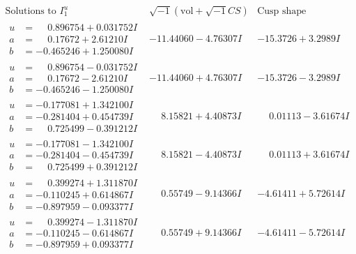 \documentclass[1p]{elsarticle_modified}
\theoremstyle{definition}
\newcommand{\I}{\sqrt{-1}}
\begin{document}
$$\begin{array}{c|c|c}  
\text{Solutions to }I^u_{1}& \I (\text{vol} + \sqrt{-1}CS) & \text{Cusp shape}\\
 \hline 
\begin{aligned}
u &= \phantom{-}0.896754 + 0.031752 I \\
a &= \phantom{-}0.17672 + 2.61210 I \\
b &= -0.465246 + 1.250080 I\end{aligned}
 & -11.44060 - 4.76307 I & -15.3726 + 3.2989 I \\ \hline\begin{aligned}
u &= \phantom{-}0.896754 - 0.031752 I \\
a &= \phantom{-}0.17672 - 2.61210 I \\
b &= -0.465246 - 1.250080 I\end{aligned}
 & -11.44060 + 4.76307 I & -15.3726 - 3.2989 I \\ \hline\begin{aligned}
u &= -0.177081 + 1.342100 I \\
a &= -0.281404 + 0.454739 I \\
b &= \phantom{-}0.725499 - 0.391212 I\end{aligned}
 & \phantom{-}8.15821 + 4.40873 I & \phantom{-}0.01113 - 3.61674 I \\ \hline\begin{aligned}
u &= -0.177081 - 1.342100 I \\
a &= -0.281404 - 0.454739 I \\
b &= \phantom{-}0.725499 + 0.391212 I\end{aligned}
 & \phantom{-}8.15821 - 4.40873 I & \phantom{-}0.01113 + 3.61674 I \\ \hline\begin{aligned}
u &= \phantom{-}0.399274 + 1.311870 I \\
a &= -0.110245 + 0.614867 I \\
b &= -0.897959 - 0.093377 I\end{aligned}
 & \phantom{-}0.55749 - 9.14366 I & -4.61411 + 5.72614 I \\ \hline\begin{aligned}
u &= \phantom{-}0.399274 - 1.311870 I \\
a &= -0.110245 - 0.614867 I \\
b &= -0.897959 + 0.093377 I\end{aligned}
 & \phantom{-}0.55749 + 9.14366 I & -4.61411 - 5.72614 I \\ \hline\begin{aligned}

\end{aligned}
\end{array}$$
\end{document}
